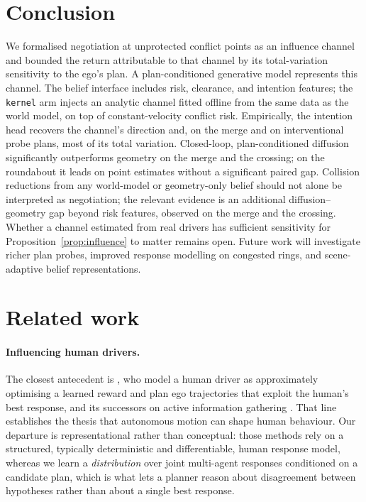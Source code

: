 \documentclass[conference]{IEEEtran}
\begin{document}
\section{Conclusion}

We formalised negotiation at unprotected conflict points as an influence channel
and bounded the return attributable to that channel by its total-variation
sensitivity to the ego's plan. A plan-conditioned generative model represents
this channel. The belief interface includes risk, clearance, and intention
features; the \texttt{kernel} arm injects an analytic channel fitted offline
from the same data as the world model, on top of constant-velocity conflict
risk. Empirically, the intention head recovers the channel's direction and, on
the merge and on interventional probe plans, most of its total variation.
Closed-loop, plan-conditioned diffusion significantly outperforms geometry on
the merge and the crossing; on the roundabout it leads on point estimates
without a significant paired gap. Collision reductions from any world-model or
geometry-only belief should not alone be interpreted as negotiation; the
relevant evidence is an additional diffusion--geometry gap beyond risk
features, observed on the merge and the crossing. Whether a channel estimated
from real drivers has sufficient sensitivity for
Proposition~\ref{prop:influence} to matter remains open. Future work will
investigate richer plan probes, improved response modelling on congested
rings, and scene-adaptive belief representations.

\newpage
\clearpage




\newpage
\clearpage

\appendices

\section{Related work}

\paragraph{Influencing human drivers.} The closest antecedent is
\cite{sadigh2016planning}, who model a human driver as approximately optimising
a learned reward and plan ego trajectories that exploit the human's best
response, and its successors on active information gathering
\cite{sadigh2018planning}. That line establishes the thesis that autonomous
motion can shape human behaviour. Our departure is representational rather than
conceptual: those methods rely on a structured, typically deterministic and
differentiable, human response model, whereas we learn a \emph{distribution}
over joint multi-agent responses conditioned on a candidate plan, which is what
lets a planner reason about disagreement between hypotheses rather than about a
single best response.
\end{document}

